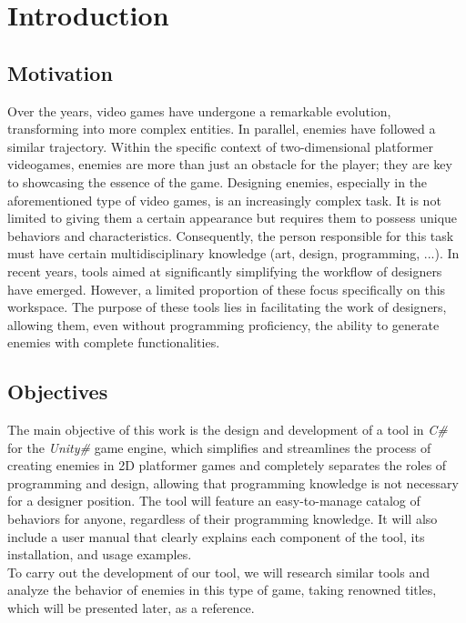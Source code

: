 \chapter*{Introduction}
\label{cap:introduction}


\section{Motivation}
Over the years, video games have undergone a remarkable evolution, transforming into more complex entities. In parallel, enemies have followed a similar trajectory. Within the specific context of two-dimensional platformer videogames, enemies are more than just an obstacle for the player; they are key to showcasing the essence of the game. Designing enemies, especially in the aforementioned type of video games, is an increasingly complex task. It is not limited to giving them a certain appearance but requires them to possess unique behaviors and characteristics. Consequently, the person responsible for this task must have certain multidisciplinary knowledge (art, design, programming, ...).
In recent years, tools aimed at significantly simplifying the workflow of designers have emerged. However, a limited proportion of these focus specifically on this workspace. The purpose of these tools lies in facilitating the work of designers, allowing them, even without programming proficiency, the ability to generate enemies with complete functionalities.

\section{Objectives}
The main objective of this work is the design and development of a tool in \textit{C\#} for the \textit{Unity\#} game engine, which simplifies and streamlines the process of creating enemies in 2D platformer games and completely separates the roles of programming and design, allowing that programming knowledge is not necessary for a designer position.
The tool will feature an easy-to-manage catalog of behaviors for anyone, regardless of their programming knowledge. It will also include a user manual that clearly explains each component of the tool, its installation, and usage examples. \\
To carry out the development of our tool, we will research similar tools and analyze the behavior of enemies in this type of game, taking renowned titles, which will be presented later, as a reference.


